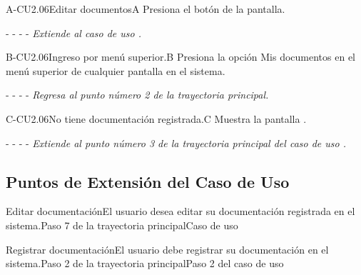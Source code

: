 
	
	\begin{UCtrayectoriaA}{A-CU2.06}{Editar documentos}{A}
	    \UCpaso[\UCactor]Presiona el botón  de la pantalla.
	    \item[- -] - - {\em Extiende al caso de uso .} 
	\end{UCtrayectoriaA}
	\begin{UCtrayectoriaA}{B-CU2.06}{Ingreso por menú superior.}{B}
	    \UCpaso[\UCactor]Presiona la opción Mis documentos en el menú superior de cualquier pantalla en el sistema. %
	    \item[- -] - - {\em Regresa al punto número 2 de la trayectoria principal.}
	\end{UCtrayectoriaA}
	
	\begin{UCtrayectoriaA}{C-CU2.06}{No tiene documentación registrada.}{C}
	    \UCpaso[\UCsist] Muestra la pantalla . %
	    \item[- -] - - {\em Extiende al punto número 3 de la trayectoria principal del caso de uso .}
	\end{UCtrayectoriaA}
	
	
	\subsection{Puntos de Extensión del Caso de Uso}

	\begin{UCExtenssionPoint}{Editar documentación}{El usuario desea editar su documentación registrada en el sistema.}{Paso 7 de la trayectoria principal}{Caso de uso  } 
	\end{UCExtenssionPoint}
	
	\begin{UCExtenssionPoint}{Registrar documentación}{El usuario debe registrar su documentación en el sistema.}{Paso 2 de la trayectoria principal}{Paso 2 del caso de uso } 
	\end{UCExtenssionPoint}